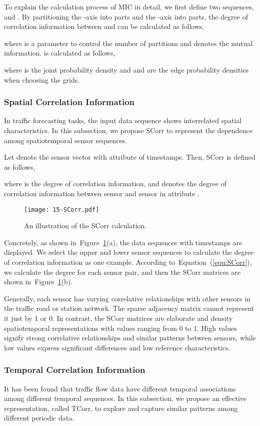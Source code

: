 \documentclass[sn-mathphys,iicol]{sn-jnl}
\newcommand\figref[1]{Figure~\ref{#1}}
\newcommand\equref[1]{Equation~(\ref{#1})}
\theoremstyle{thmstyleone}\newtheorem{theorem}{Theorem}\newtheorem{proposition}[theorem]{Proposition}
\theoremstyle{thmstyletwo}\newtheorem{example}{Example}\newtheorem{remark}{Remark}
\theoremstyle{thmstylethree}\newtheorem{definition}{Definition}
\begin{document}
To explain the calculation process of MIC in detail, we first define two sequences,  and . By partitioning the -axis into  parts and the -axis into  parts, the degree of correlation information between  and  can be calculated as follows,

where  is a parameter to control the number of partitions and  denotes the mutual information.  is calculated as follows,

where  is the joint probability density and  and  are the edge probability densities when choosing the  grids.

\subsubsection{Spatial Correlation Information}
In traffic forecasting tasks, the input data sequence shows interrelated spatial characteristics. In this subsection, we propose SCorr to represent the dependence among spatiotemporal sensor sequences.

Let  denote the sensor  vector with attribute  of  timestamps. Then, SCorr is defined as follows,

where  is the degree of correlation information, and  denotes the degree of correlation information between sensor  and sensor  in attribute . 

\begin{figure}[h]
\centering
\texttt{[image: 15-SCorr.pdf]}
\caption{An illustration of the SCorr calculation.}
\label{fig:SCorr}
\end{figure}

Concretely, as shown in~\figref{fig:SCorr}(a), the data sequences with  timestamps are displayed. We select the upper and lower sensor sequences to calculate the degree of correlation information as one example. According to~\equref{equ:SCorr}, we calculate the degree for each sensor pair, and then the SCorr matrices are shown in~\figref{fig:SCorr}(b).

Generally, each sensor has varying correlative relationships with other sensors in the traffic road or station network. The sparse adjacency matrix cannot represent it just by 1 or 0. In contrast, the SCorr matrices are elaborate and density spatiotemporal representations with values ranging from 0 to 1. High values signify strong correlative relationships and similar patterns between sensors, while low values express significant differences and low reference characteristics.

\subsubsection{Temporal Correlation Information}
\label{sec:TCorr-define}
It has been found that traffic flow data have different temporal associations among different temporal sequences. In this subsection, we propose an effective representation, called TCorr, to explore and capture similar patterns among different periodic data.
\end{document}
